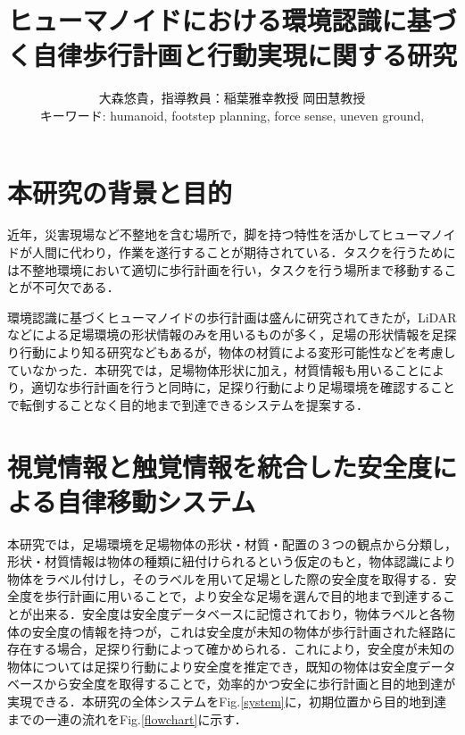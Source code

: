 \documentclass[twocolumn]{preport}
\title{ヒューマノイドにおける環境認識に基づく自律歩行計画と行動実現に関する研究}
\author{大森悠貴，指導教員：稲葉雅幸教授 岡田慧教授 \\
キーワード: humanoid, footstep planning, force sense, uneven ground, }
\renewcommand{\figref}[1]{Fig.\ref{#1}}
\begin{document}
\pagestyle{empty}
\maketitle
\thispagestyle{empty}
\sloppy

\section{本研究の背景と目的}
近年，災害現場など不整地を含む場所で，脚を持つ特性を活かしてヒューマノイドが人間に代わり，作業を遂行することが期待されている．タスクを行うためには不整地環境において適切に歩行計画を行い，タスクを行う場所まで移動することが不可欠である．

環境認識に基づくヒューマノイドの歩行計画は盛んに研究されてきた\cite{ueda2014biped}が，LiDARなどによる足場環境の形状情報のみを用いるものが多く，足場の形状情報を足探り行動により知る研究などもある\cite{wiedebach2016walking}が，物体の材質による変形可能性などを考慮していなかった．本研究では，足場物体形状に加え，材質情報も用いることにより，適切な歩行計画を行うと同時に，足探り行動により足場環境を確認することで転倒することなく目的地まで到達できるシステムを提案する．

\section{視覚情報と触覚情報を統合した安全度による自律移動システム}
本研究では，足場環境を足場物体の形状・材質・配置の３つの観点から分類し，形状・材質情報は物体の種類に紐付けられるという仮定のもと，物体認識により物体をラベル付けし，そのラベルを用いて足場とした際の安全度を取得する．安全度を歩行計画に用いることで，より安全な足場を選んで目的地まで到達することが出来る．安全度は安全度データベースに記憶されており，物体ラベルと各物体の安全度の情報を持つが，これは安全度が未知の物体が歩行計画された経路に存在する場合，足探り行動によって確かめられる．これにより，安全度が未知の物体については足探り行動により安全度を推定でき，既知の物体は安全度データベースから安全度を取得することで，効率的かつ安全に歩行計画と目的地到達が実現できる．本研究の全体システムを\figref{system}に，初期位置から目的地到達までの一連の流れを\figref{flowchart}に示す．
\end{document}
